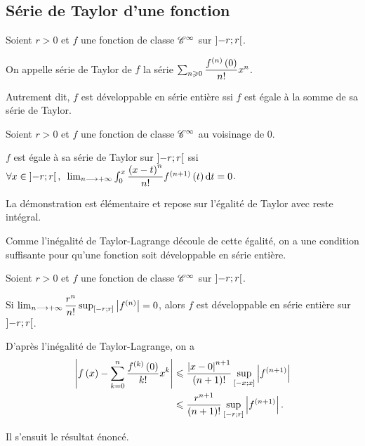 \subsection{Série de Taylor d'une fonction}

\begin{defi}
Soient \(r>0\) et \(f\) une fonction de classe \(\mathscr{C}^{\infty}\) sur \(\left]-r;r\right[\).

On appelle série de Taylor de \(f\) la série \(\sum_{n\geqslant0}\dfrac{f^{\left(n\right)}\left(0\right)}{n!}x^n\).
\end{defi}

Autrement dit, \(f\) est développable en série entière ssi \(f\) est égale à la somme de sa série de Taylor.

\begin{prop}
Soient \(r>0\) et \(f\) une fonction de classe \(\mathscr{C}^{\infty}\) au voisinage de \(0\).

\(f\) est égale à sa série de Taylor sur \(\left]-r;r\right[\) ssi \(\quantifs{\forall x\in\intervee{-r}{r}}\lim_{n\to\pinf}\int_0^x\dfrac{\paren{x-t}^n}{n!}f\deriv{n+1}\paren{t}\odif{t}=0\).
\end{prop}

La démonstration est élémentaire et repose sur l'égalité de Taylor avec reste intégral.

Comme l'inégalité de Taylor-Lagrange découle de cette égalité, on a une condition suffisante pour qu'une fonction soit développable en série entière.

\begin{prop}
Soient \(r>0\) et \(f\) une fonction de classe \(\mathscr{C}^{\infty}\) sur \(\left]-r;r\right[\).

Si \(\lim_{n\longrightarrow+\infty}\dfrac{r^n}{n!}\sup_{\left[-r;r\right]}\left\lvert f^{\left(n\right)}\right\rvert=0\), alors \(f\) est développable en série entière sur \(\left]-r;r\right[\).
\end{prop}

\begin{dem}
D'après l'inégalité de Taylor-Lagrange, on a \[\begin{aligned}
\left\lvert f\left(x\right)-\sum_{k=0}^n\dfrac{f^{\left(k\right)}\left(0\right)}{k!}x^k\right\rvert&\leqslant\dfrac{\left\lvert x-0\right\rvert^{n+1}}{\left(n+1\right)!}\sup_{\left[-x;x\right]}\left\lvert f^{\left(n+1\right)}\right\rvert \\
&\leqslant\dfrac{r^{n+1}}{\left(n+1\right)!}\sup_{\left[-r;r\right]}\left\lvert f^{\left(n+1\right)}\right\rvert.
\end{aligned}\]

Il s'ensuit le résultat énoncé.
\end{dem}

